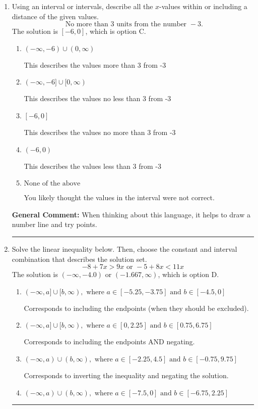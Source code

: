 \documentclass{extbook}[14pt]
\newcommand{\litem}[1]{\item #1

\rule{\textwidth}{0.4pt}}
\begin{document}
\begin{enumerate}
{\textbf{General Comment:} Remember that less/greater than or equal to includes the endpoint, while less/greater do not. Also, remember that you need to flip the inequality when you multiply or divide by a negative.
}
\litem{
Using an interval or intervals, describe all the $x$-values within or including a distance of the given values.
\[ \text{ No more than } 3 \text{ units from the number } -3. \]The solution is \( [-6, 0] \), which is option C.\begin{enumerate}[label=\Alph*.]
\item \( (-\infty, -6) \cup (0, \infty) \)

This describes the values more than 3 from -3
\item \( (-\infty, -6] \cup [0, \infty) \)

This describes the values no less than 3 from -3
\item \( [-6, 0] \)

This describes the values no more than 3 from -3
\item \( (-6, 0) \)

This describes the values less than 3 from -3
\item \( \text{None of the above} \)

You likely thought the values in the interval were not correct.
\end{enumerate}

\textbf{General Comment:} When thinking about this language, it helps to draw a number line and try points.
}
\litem{
Solve the linear inequality below. Then, choose the constant and interval combination that describes the solution set.
\[ -8 + 7 x > 9 x \text{ or } -5 + 8 x < 11 x \]The solution is \( (-\infty, -4.0) \text{ or } (-1.667, \infty) \), which is option D.\begin{enumerate}[label=\Alph*.]
\item \( (-\infty, a] \cup [b, \infty), \text{ where } a \in [-5.25, -3.75] \text{ and } b \in [-4.5, 0] \)

Corresponds to including the endpoints (when they should be excluded).
\item \( (-\infty, a] \cup [b, \infty), \text{ where } a \in [0, 2.25] \text{ and } b \in [0.75, 6.75] \)

Corresponds to including the endpoints AND negating.
\item \( (-\infty, a) \cup (b, \infty), \text{ where } a \in [-2.25, 4.5] \text{ and } b \in [-0.75, 9.75] \)

Corresponds to inverting the inequality and negating the solution.
\item \( (-\infty, a) \cup (b, \infty), \text{ where } a \in [-7.5, 0] \text{ and } b \in [-6.75, 2.25] \)


\end{enumerate}}
\end{enumerate}
\end{document}
